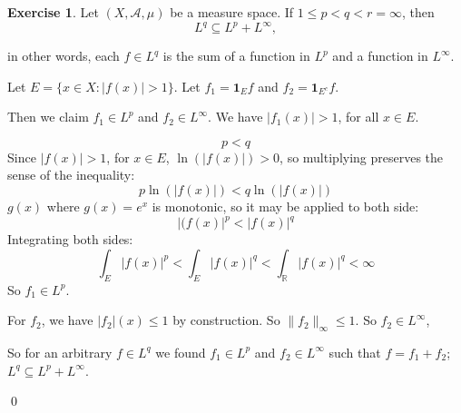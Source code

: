 \documentclass[11pt,oneside]{article}
\numberwithin{equation}{section}
\theoremstyle{definition}
\newtheorem{exercise}{Exercise}
\def\RR{\mathbb{R}}
\def\fancyA{\mathscr{A}}
\def\one{\mathbf{1}}
\begin{document}
\begin{exercise}
  Let $(X, \fancyA, \mu) $ be a measure space.  If $1 \leq p < q < r = \infty$, then
  \[
  L^q \subseteq L^p + L^\infty,
  \]
  
  in other words, each $f \in L^q$ is the sum of a function in $L^p$ and a function in $L^\infty$. 
\end{exercise}
\begin{solution}
  Let $E = \{ x \in X : | f(x) | > 1 \}$.  Let $f_1 = \one_E f$ and $f_2 = \one_{E^c} f$.

  Then we claim $f_1 \in L^p$ and $f_2 \in L^\infty$.  We have $|f_1(x)| > 1$, for all $x \in E$.

  \[
  p < q
  \]
  Since $|f(x)| > 1$, for $x \in E$, $\ln (|f(x)|) > 0$, so
  multiplying preserves the sense of the inequality:
  \[
  p \ln (|f(x)|) < q \ln (|f(x)|)
  \]
  $g(x)$ where $g(x) = e^x$ is monotonic, so it may be applied to both side:
  \[
  |(f(x)|^p < |f(x)|^q
  \]
  Integrating both sides:
  \[
  \int_E |f(x)|^p < \int_E |f(x)|^q < \int_\RR |f(x)|^q < \infty
  \]
  So $f_1 \in L^p$.

  For $f_2$, we have $ | f_2| (x) \leq 1 $ by construction.  So $ \| f_2 \| _\infty \leq 1$.
  So $f_2 \in L^\infty$, 
  
  So for an arbitrary $f \in L^q$ we found $f_1 \in L^p$ and $f_2 \in L^\infty$ such that $f = f_1 + f_2$; $L^q \subseteq L^p + L^\infty$.

  \qed
  
\end{solution}

\end{document}
